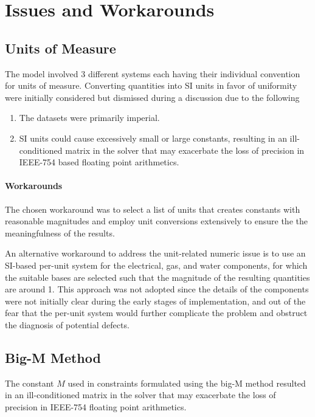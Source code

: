 \documentclass{article}
\begin{document}
\section{Issues and Workarounds}

\subsection{Units of Measure}
The model involved 3 different systems each having their individual convention
for units of measure. Converting quantities into SI units in favor of uniformity
were initially considered but dismissed during a discussion due to the following

\begin{enumerate}
\item The datasets were primarily imperial.
\item SI units could cause excessively small or large constants, resulting in an
  ill-conditioned matrix in the solver that may exacerbate the loss of precision
  in IEEE-754 based floating point arithmetics.
\end{enumerate}

\paragraph{Workarounds}
The chosen workaround was to select a list of units that creates constants with
reasonable magnitudes and employ unit conversions extensively to ensure the the
meaningfulness of the results.

An alternative workaround to address the unit-related numeric issue is to use an
SI-based per-unit system for the electrical, gas, and water components, for
which the suitable bases are selected such that the magnitude of the resulting
quantities are around 1. This approach was not adopted since the details of the
components were not initially clear during the early stages of implementation,
and out of the fear that the per-unit system would further complicate the
problem and obstruct the diagnosis of potential defects.


\subsection{Big-M Method}
The constant $M$ used in constraints formulated using the big-M method resulted
in an ill-conditioned matrix in the solver that may exacerbate the loss of
precision in IEEE-754 floating point arithmetics.
\end{document}

